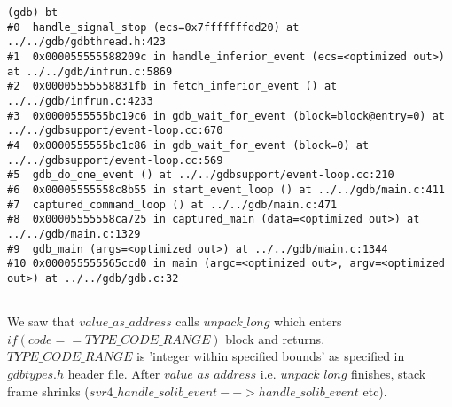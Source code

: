\documentclass{report}
\begin{document}
\begin{verbatim}
(gdb) bt
#0  handle_signal_stop (ecs=0x7fffffffdd20) at ../../gdb/gdbthread.h:423
#1  0x000055555588209c in handle_inferior_event (ecs=<optimized out>) at ../../gdb/infrun.c:5869
#2  0x00005555558831fb in fetch_inferior_event () at ../../gdb/infrun.c:4233
#3  0x0000555555bc19c6 in gdb_wait_for_event (block=block@entry=0) at ../../gdbsupport/event-loop.cc:670
#4  0x0000555555bc1c86 in gdb_wait_for_event (block=0) at ../../gdbsupport/event-loop.cc:569
#5  gdb_do_one_event () at ../../gdbsupport/event-loop.cc:210
#6  0x00005555558c8b55 in start_event_loop () at ../../gdb/main.c:411
#7  captured_command_loop () at ../../gdb/main.c:471
#8  0x00005555558ca725 in captured_main (data=<optimized out>) at ../../gdb/main.c:1329
#9  gdb_main (args=<optimized out>) at ../../gdb/main.c:1344
#10 0x000055555565ccd0 in main (argc=<optimized out>, argv=<optimized out>) at ../../gdb/gdb.c:32


\end{verbatim}
We saw that $value\_as\_address$ calls $unpack\_long$ which enters $if (code == TYPE\_CODE\_RANGE)$ block and returns. $TYPE\_CODE\_RANGE$ is 'integer within specified bounds' as specified in $gdbtypes.h$ header file. After $value\_as\_address$ i.e. $unpack\_long$ finishes, stack frame shrinks ($svr4\_handle\_solib\_event --> handle\_solib\_event$ etc).
\end{document}
